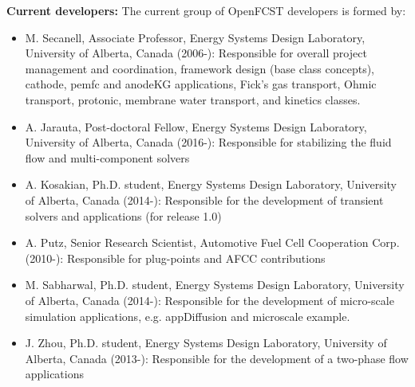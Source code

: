 \textbf{Current developers:} The current group of OpenFCST developers is formed by:
\begin{itemize}
\item M. Secanell, Associate Professor, Energy Systems Design Laboratory, University of Alberta, Canada (2006-): Responsible for overall project management and coordination, framework design (base class concepts), cathode, pemfc and anodeKG applications, Fick's gas transport, Ohmic transport, protonic, membrane water transport,  and kinetics classes.
\item A. Jarauta, Post-doctoral Fellow, Energy Systems Design Laboratory, University of Alberta, Canada (2016-): Responsible for stabilizing the fluid flow and multi-component solvers
\item A. Kosakian, Ph.D. student, Energy Systems Design Laboratory, University of Alberta, Canada (2014-): Responsible for the development of transient solvers and applications (for release 1.0)
\item A. Putz, Senior Research Scientist, Automotive Fuel Cell Cooperation Corp. (2010-): Responsible for plug-points and AFCC contributions 
\item M. Sabharwal, Ph.D. student, Energy Systems Design Laboratory, University of Alberta, Canada (2014-): Responsible for the development of micro-scale simulation applications, e.g. appDiffusion and microscale example.   
\item J. Zhou, Ph.D. student, Energy Systems Design Laboratory, University of Alberta, Canada (2013-): Responsible for the development of a two-phase flow applications
\end{itemize}

